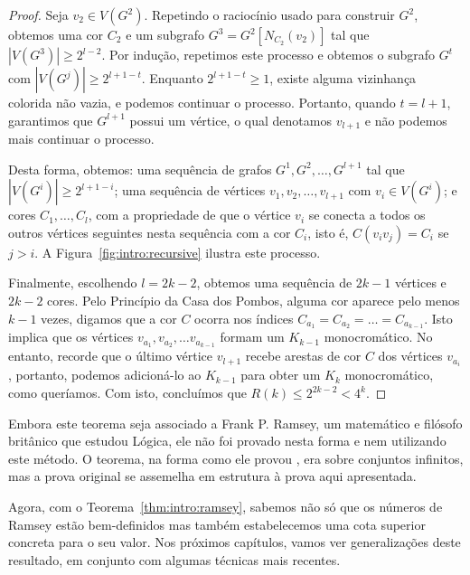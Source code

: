 \begin{proof}
Seja $v_2 \in V(G^2)$. Repetindo o raciocínio usado para construir $G^2$, obtemos uma cor $C_2$ e um subgrafo $G^3 = G^2[N_{C_2}(v_2)]$ tal que $|V(G^3)| \geq 2^{l-2}$. Por indução, repetimos este processo e obtemos o subgrafo $G^t$ com $|V(G^j)| \geq 2^{l+1-t}$. Enquanto $2^{l+1-t} \geq 1$, existe alguma vizinhança colorida não vazia, e podemos continuar o processo. Portanto, quando $t = l+1$, garantimos que $G^{l+1}$ possui um vértice, o qual denotamos $v_{l+1}$ e não podemos mais continuar o processo.

Desta forma, obtemos: uma sequência de grafos $G^1, G^2, \dots, G^{l+1}$ tal que $|V(G^i)| \geq 2^{l+1-i}$; uma sequência de vértices $v_1, v_2, \dots, v_{l+1}$ com $v_i \in V(G^i)$; e cores $C_1, \dots, C_l$, com a propriedade de que o vértice $v_i$ se conecta a todos os outros vértices seguintes nesta sequência com a cor $C_i$, isto é, $C(v_i v_j) = C_i$ se $j > i$. A Figura~\ref{fig:intro:recursive} ilustra este processo.

Finalmente, escolhendo $l = 2k - 2$, obtemos uma sequência de $2k - 1$ vértices e $2k - 2$ cores. Pelo Princípio da Casa dos Pombos, alguma cor aparece pelo menos $k - 1$ vezes, digamos que a cor $C$ ocorra nos índices $C_{a_1} =  C_{a_2} = \dots = C_{a_{k-1}}$. Isto implica que os vértices $v_{a_1}, v_{a_2}, \dots v_{a_{k-1}}$ formam um $K_{k-1}$ monocromático.
No entanto, recorde que o último vértice $v_{l+1}$ recebe arestas de cor $C$ dos vértices $v_{a_{i}}$, portanto, podemos adicioná-lo ao $K_{k-1}$ para obter um $K_k$ monocromático, como queríamos. Com isto, concluímos que $R(k) \leq 2^{2k - 2} < 4^k$.
\end{proof}

Embora este teorema seja associado a Frank P. Ramsey, um matemático e filósofo britânico que estudou Lógica, ele não foi provado nesta forma e nem utilizando este método. O teorema, na forma como ele provou \cite{ramsey}, era sobre conjuntos infinitos, mas a prova original se assemelha em estrutura à prova aqui apresentada.

Agora, com o Teorema~\ref{thm:intro:ramsey}, sabemos não só que os números de Ramsey estão bem-definidos mas também estabelecemos uma cota superior concreta para o seu valor. Nos próximos capítulos, vamos ver generalizações deste resultado, em conjunto com algumas técnicas mais recentes.

